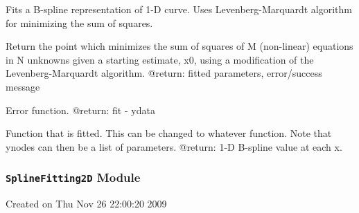 \documentclass[letterpaper,10pt,english]{sphinxmanual}
\begin{document}
\begin{fulllineitems}
\label{SamPy.fitting:SamPy.fitting.SplineFitting.SplineFitting}
Fits a B-spline representation of 1-D curve.
Uses Levenberg-Marquardt algorithm for minimizing 
the sum of squares.


\begin{fulllineitems}
\label{SamPy.fitting:SamPy.fitting.SplineFitting.SplineFitting.doFit}
Return the point which minimizes the sum of squares of M (non-linear)
equations in N unknowns given a starting estimate, x0, using a
modification of the Levenberg-Marquardt algorithm.
@return: fitted parameters, error/success message

\end{fulllineitems}



\begin{fulllineitems}
\label{SamPy.fitting:SamPy.fitting.SplineFitting.SplineFitting.errfunc}
Error function.
@return: fit - ydata

\end{fulllineitems}



\begin{fulllineitems}
\label{SamPy.fitting:SamPy.fitting.SplineFitting.SplineFitting.fitfunc}
Function that is fitted.
This can be changed to whatever function.
Note that ynodes can then be a list of parameters.
@return: 1-D B-spline value at each x.

\end{fulllineitems}


\end{fulllineitems}



\subsubsection{\texttt{SplineFitting2D} Module}
\label{SamPy.fitting:splinefitting2d-module}\label{SamPy.fitting:module-SamPy.fitting.SplineFitting2D}
Created on Thu Nov 26 22:00:20 2009
\end{document}
